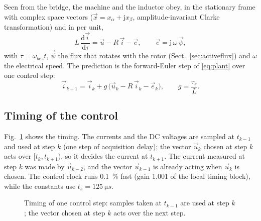 \documentclass[10pt,a4paper]{scrartcl}
\newcommand{\ts}{t_s}
\newcommand{\tspu}{\tau_s}
\newcommand{\jj}{\mathrm{j}}
\newcommand{\wb}{\omega_{bez}}
\begin{document}
\begin{onehalfspace}
Seen from the bridge, the machine and the inductor obey, in the stationary frame with complex space vectors ($\vec x = x_\alpha + \jj x_\beta$, amplitude-invariant Clarke transformation) and in per unit,
\begin{equation}
L\,\frac{\mathrm{d}\vec i}{\mathrm{d}\tau} = \vec u - R\,\vec i - \vec e, \qquad \vec e = \jj\,\omega\,\vec\psi,
\label{eq:plant}
\end{equation}
with $\tau = \wb t$, $\vec\psi$ the flux that rotates with the rotor (Sect.~\ref{sec:activeflux}) and $\omega$ the electrical speed. The prediction is the forward-Euler step of \eqref{eq:plant} over one control step:
\begin{equation}
\vec i_{k+1} = \vec i_k + g\,\big(\vec u_k - R\,\vec i_k - \vec e_k\big), \qquad g = \frac{\tspu}{L}.
\label{eq:pred}
\end{equation}

\subsection{Timing of the control}

Fig.~\ref{fig:timing} shows the timing. The currents and the DC voltages are sampled at $t_{k-1}$ and used at step $k$ (one step of acquisition delay); the vector $\vec u_k$ chosen at step $k$ acts over $[t_k, t_{k+1})$, so it decides the current at $t_{k+1}$. The current measured at step $k$ was made by $\vec u_{k-2}$, and the vector $\vec u_{k-1}$ is already acting when $\vec u_k$ is chosen. The control clock runs \SI{0.1}{\percent} fast (gain 1.001 of the local timing block), while the constants use $\ts = \SI{125}{\micro s}$.

\begin{figure}[htb]
\centering
{}
\caption{Timing of one control step: samples taken at $t_{k-1}$ are used at step $k$; the vector chosen at step $k$ acts over the next step.}
\label{fig:timing}
\end{figure}


\end{onehalfspace}
\end{document}
